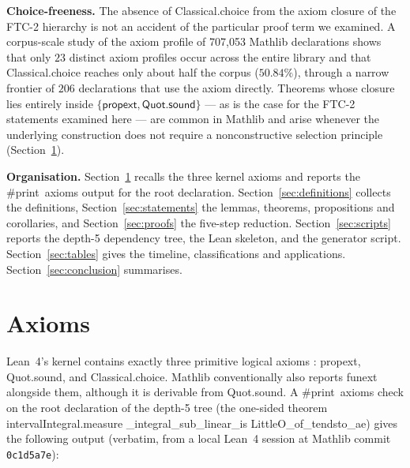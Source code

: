 \documentclass[11pt,reqno]{amsart}
\begin{document}
\smallskip\noindent\textbf{Choice-freeness.} The absence of \textsf{%
Classical\allowbreak.choice} from the axiom closure of the FTC-2 hierarchy
is not an accident of the particular proof term we examined. A corpus-scale
study of the axiom profile of 707{,}053 Mathlib declarations \cite%
{close2026axiom} shows that only $23$ distinct axiom profiles occur across
the entire library and that \textsf{Classical\allowbreak.choice} reaches
only about half the corpus ($50.84\%$), through a narrow frontier of $206$
declarations that use the axiom directly. Theorems whose closure lies
entirely inside $\{\mathsf{propext},\mathsf{Quot\allowbreak.sound}\}$ --- as
is the case for the FTC-2 statements examined here --- are common in Mathlib
and arise whenever the underlying construction does not require a
nonconstructive selection principle (Section~\ref{sec:axioms}).

\smallskip\noindent\textbf{Organisation.} Section~\ref{sec:axioms} recalls
the three kernel axioms and reports the \textsf{\#print\ axioms} output for
the root declaration. Section~\ref{sec:definitions} collects the
definitions, Section~\ref{sec:statements} the lemmas, theorems, propositions
and corollaries, and Section~\ref{sec:proofs} the five-step reduction.
Section~\ref{sec:scripts} reports the depth-5 dependency tree, the Lean
skeleton, and the generator script. Section~\ref{sec:tables} gives the
timeline, classifications and applications. Section~\ref{sec:conclusion}
summarises.

\section{Axioms}

\label{sec:axioms}

\noindent Lean~4's kernel contains exactly three primitive logical axioms 
\cite{mathlib4, mathlib4-docs}: \textsf{propext}, \textsf{%
Quot\allowbreak.sound}, and \textsf{Classical\allowbreak.choice}. Mathlib
conventionally also reports \textsf{funext} alongside them, although it is
derivable from \textsf{Quot\allowbreak.sound}. \noindent A \textsf{\#print\
axioms} check on the root declaration of the depth-5 tree (the one-sided
theorem \textsf{interval\allowbreak Integral.measure\allowbreak
\_integral\allowbreak \_sub\allowbreak \_linear\allowbreak \_is\allowbreak
LittleO\allowbreak \_of\allowbreak \_tendsto\allowbreak \_ae}) gives the
following output (verbatim, from a local Lean~4 session at Mathlib commit 
\texttt{0c1d5a7e}{}):
\end{document}
